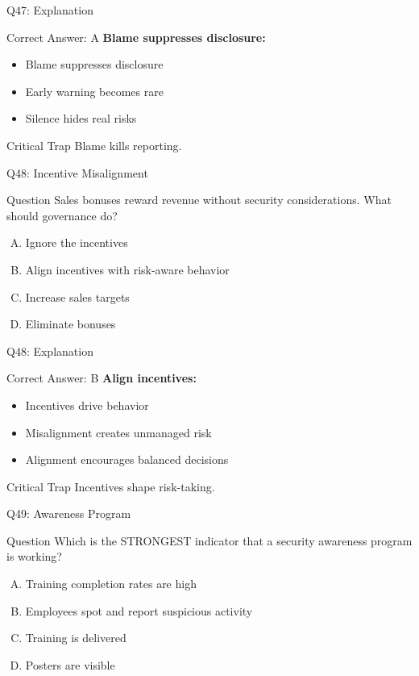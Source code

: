 \documentclass{beamer}
\begin{document}
	\begin{frame}{Q47: Explanation}
		\begin{block}{Correct Answer: A}
			\textbf{Blame suppresses disclosure:}
			\begin{itemize}
				\item Blame suppresses disclosure
				\item Early warning becomes rare
				\item Silence hides real risks
			\end{itemize}
		\end{block}
		\begin{alertblock}{Critical Trap}
			Blame kills reporting.
		\end{alertblock}
	\end{frame}
	
	\begin{frame}{Q48: Incentive Misalignment}
		\begin{block}{Question}
			Sales bonuses reward revenue without security considerations. What should governance do?
		\end{block}
		\begin{enumerate}[(A)]
			\item Ignore the incentives
			\item Align incentives with risk-aware behavior
			\item Increase sales targets
			\item Eliminate bonuses
		\end{enumerate}
	\end{frame}
	
	\begin{frame}{Q48: Explanation}
		\begin{block}{Correct Answer: B}
			\textbf{Align incentives:}
			\begin{itemize}
				\item Incentives drive behavior
				\item Misalignment creates unmanaged risk
				\item Alignment encourages balanced decisions
			\end{itemize}
		\end{block}
		\begin{alertblock}{Critical Trap}
			Incentives shape risk-taking.
		\end{alertblock}
	\end{frame}
	
	\begin{frame}{Q49: Awareness Program}
		\begin{block}{Question}
			Which is the STRONGEST indicator that a security awareness program is working?
		\end{block}
		\begin{enumerate}[(A)]
			\item Training completion rates are high
			\item Employees spot and report suspicious activity
			\item Training is delivered
			\item Posters are visible
		\end{enumerate}
	\end{frame}
	
\end{document}
